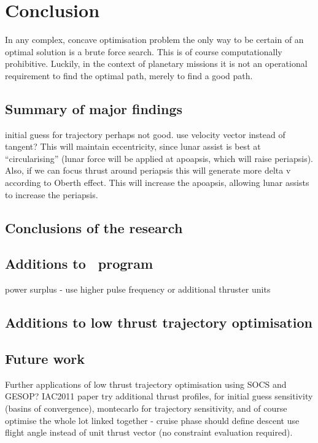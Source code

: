 \chapter{Conclusion} \label{cha:Conclusion}

In any complex, concave optimisation problem the only way to be certain of an optimal solution is a brute force search. This is of course computationally prohibitive. Luckily, in the context of planetary missions it is not an operational requirement to find the optimal path, merely to find a good path. 


\section{Summary of major findings}
initial guess for trajectory perhaps not good. use velocity vector instead of tangent? This will maintain eccentricity, since lunar assist is best at \enquote{circularising} (lunar force will be applied at apoapsis, which will raise periapsis).
Also, if we can focus thrust around periapsis this will generate more delta v according to Oberth effect. This will increase the apoapsis, allowing lunar assists to increase the periapsis.

\section{Conclusions of the research}

\section{Additions to \BW\ program}
power surplus - use higher pulse frequency or additional thruster units

\section{Additions to low thrust trajectory optimisation}

\section{Future work}
Further applications of low thrust trajectory optimisation using SOCS and GESOP? IAC2011 paper
try additional thrust profiles, for initial guess sensitivity (basins of convergence), montecarlo for trajectory sensitivity, and of course optimise the whole lot linked together - cruise phase should define descent
use flight angle instead of unit thrust vector (no constraint evaluation required).








